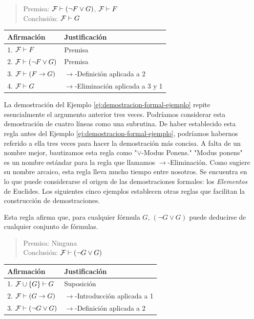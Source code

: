 \message{ !name(main.tex)}\documentclass[12pt,a4paper]{book}
\makeatletter
\newcommand{\comillas}[1]{"#1"}
\newenvironment{derivacion}{%
  \begingroup
  \renewcommand{\arraystretch}{1.35}
  \begin{center}
  \begin{tabular}{@{}l l@{}}
    \textbf{Afirmación} & \textbf{Justificación}\\
    \hline
}{%
  \end{tabular}
  \end{center}
  \endgroup
}
\makeatother
\begin{document}
    \begin{quote}
        Premisa: $\mathcal{F}\vdash(\neg F\vee G)$, $\mathcal{F}\vdash F$\\
        Conclusión: $\mathcal{F}\vdash G$
    \end{quote}

    \begin{derivacion}
        1. $\mathcal{F}\vdash F$ & Premisa\\
        2. $\mathcal{F}\vdash(\neg F\vee G)$ & Premisa\\
        3. $\mathcal{F}\vdash(F\rightarrow G)$ & $\rightarrow$-Definición aplicada a 2\\
        4. $\mathcal{F}\vdash G$ & $\rightarrow$-Eliminación aplicada a 3 y 1\\
    \end{derivacion}

    La demostración del Ejemplo \ref{ej:demostracion-formal-ejemplo} repite esencialmente el argumento anterior tres veces.
    Podríamos considerar esta demostración de cuatro líneas como una subrutina. De haber establecido esta regla antes del
    Ejemplo \ref{ej:demostracion-formal-ejemplo}, podríamos habernos referido a ella tres veces para hacer la demostración más
    concisa. A falta de un nombre mejor, bautizamos esta regla como \comillas{$\vee$-Modus Ponens.} \comillas{Modus ponens} es un
    nombre estándar para la regla que llamamos $\rightarrow$-Eliminación. Como sugiere su nombre arcaico, esta regla lleva mucho
    tiempo entre nosotros. Se encuentra en lo que puede considerarse el origen de las demostraciones formales: los
    \textit{Elementos} de Euclides. Los siguientes cinco ejemplos establecen otras reglas que facilitan la construcción de
    demostraciones.

    \begin{ejemplo}\label{ej:regla-tautologia}
        Esta regla afirma que, para cualquier fórmula $G$, $(\neg G\vee G)$ puede deducirse de cualquier conjunto de fórmulas.

        \begin{quote}
            Premisa: Ninguna\\
            Conclusión: $\mathcal{F}\vdash(\neg G\vee G)$
        \end{quote}

        \begin{derivacion}
            1. $\mathcal{F}\cup\{G\}\vdash G$ & Suposición\\
            2. $\mathcal{F}\vdash(G\rightarrow G)$ & $\rightarrow$-Introducción aplicada a 1\\
            3. $\mathcal{F}\vdash(\neg G\vee G)$ & $\rightarrow$-Definición aplicada a 2\\
        \end{derivacion}
    \end{ejemplo}
\end{document}
